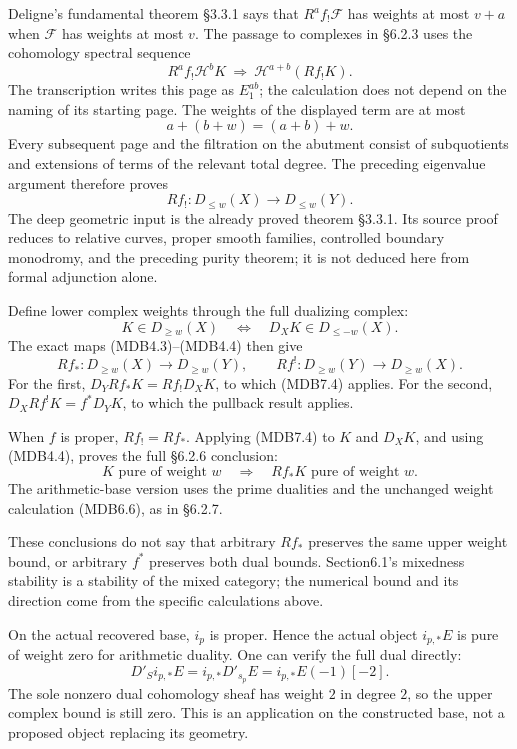 \documentclass[
]{report}
\begin{document}
Deligne's fundamental theorem §3.3.1 says that \(R^a f_!\mathcal F\) has
weights at most \(v+a\) when \(\mathcal F\) has weights at most \(v\).
The passage to complexes in §6.2.3 uses the cohomology spectral sequence
\[
R^a f_!\mathcal H^bK\ \Longrightarrow\
\mathcal H^{a+b}(Rf_!K).
\tag{MDB7.2}
\] The transcription writes this page as \(E_1^{ab}\); the calculation
does not depend on the naming of its starting page. The weights of the
displayed term are at most \[
a+(b+w)=(a+b)+w.
\tag{MDB7.3}
\] Every subsequent page and the filtration on the abutment consist of
subquotients and extensions of terms of the relevant total degree. The
preceding eigenvalue argument therefore proves \[
Rf_!:D_{\leq w}(X)\longrightarrow D_{\leq w}(Y).
\tag{MDB7.4}
\] The deep geometric input is the already proved theorem §3.3.1. Its
source proof reduces to relative curves, proper smooth families,
controlled boundary monodromy, and the preceding purity theorem; it is
not deduced here from formal adjunction alone.

Define lower complex weights through the full dualizing complex: \[
K\in D_{\geq w}(X)
\quad\Longleftrightarrow\quad
D_XK\in D_{\leq-w}(X).
\tag{MDB7.5}
\] The exact maps (MDB4.3)--(MDB4.4) then give \[
Rf_*:D_{\geq w}(X)\to D_{\geq w}(Y),\qquad
Rf^!:D_{\geq w}(Y)\to D_{\geq w}(X).
\tag{MDB7.6}
\] For the first, \(D_YRf_*K=Rf_!D_XK\), to which (MDB7.4) applies. For
the second, \(D_XRf^!K=f^*D_YK\), to which the pullback result applies.

When \(f\) is proper, \(Rf_!=Rf_*\). Applying (MDB7.4) to \(K\) and
\(D_XK\), and using (MDB4.4), proves the full §6.2.6 conclusion: \[
K\text{ pure of weight }w
\quad\Longrightarrow\quad
Rf_*K\text{ pure of weight }w.
\tag{MDB7.7}
\] The arithmetic-base version uses the prime dualities and the
unchanged weight calculation (MDB6.6), as in §6.2.7.

These conclusions do not say that arbitrary \(Rf_*\) preserves the same
upper weight bound, or arbitrary \(f^*\) preserves both dual bounds.
Section6.1's mixedness stability is a stability of the mixed category;
the numerical bound and its direction come from the specific
calculations above.

On the actual recovered base, \(i_p\) is proper. Hence the actual object
\(i_{p,*}E\) is pure of weight zero for arithmetic duality. One can
verify the full dual directly: \[
D'_S i_{p,*}E
=i_{p,*}D'_{s_p}E
=i_{p,*}E(-1)[-2].
\tag{MDB7.8}
\] The sole nonzero dual cohomology sheaf has weight \(2\) in degree
\(2\), so the upper complex bound is still zero. This is an application
on the constructed base, not a proposed object replacing its geometry.
\end{document}
